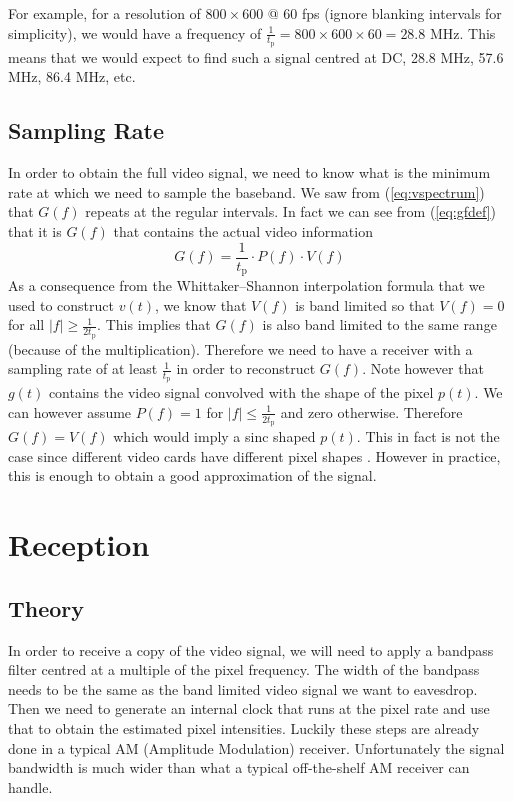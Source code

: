 \documentclass[a4paper,12pt,twoside,openright]{report}
\begin{document}
For example, for a resolution of $800 \times 600 $ @ $ 60$ fps (ignore blanking intervals for simplicity), we would have a frequency of $\frac{1}{t_\text{p}} = 800 \times 600 \times 60 = 28.8$ MHz. This means that we would expect to find such a signal centred at DC, 28.8 MHz, 57.6 MHz, 86.4 MHz, etc.

\subsection{Sampling Rate}

In order to obtain the full video signal, we need to know what is the minimum rate at which we need to sample the baseband. We saw from (\ref{eq:vspectrum}) that $G(f)$ repeats at the regular intervals. In fact we can see from (\ref{eq:gfdef}) that it is $G(f)$ that contains the actual video information
$$G(f) = \frac{1}{t_\text{p}} \cdot P(f) \cdot V(f)$$
As a consequence from the Whittaker--Shannon interpolation formula that we used to construct $v(t)$, we know that $V(f)$ is band limited so that $V(f) = 0$ for all $|f| \geq \frac{1}{2 t_\text{p}}$. This implies that $G(f)$ is also band limited to the same range (because of the multiplication). Therefore we need to have a receiver with a sampling rate of at least $\frac{1}{t_\text{p}}$ in order to reconstruct $G(f)$. Note however that $g(t)$ contains the video signal convolved with the shape of the pixel $p(t)$. We can however assume $P(f)=1$ for $|f| \le \frac{1}{2 t_\text{p}}$ and zero otherwise. Therefore $G(f) = V(f)$ which would imply a sinc shaped $p(t)$. This in fact is not the case since different video cards have different pixel shapes \cite{kuhn2003compromising}. However in practice, this is enough to obtain a good approximation of the signal.

\section{Reception}

\subsection{Theory}
In order to receive a copy of the video signal, we will need to apply a bandpass filter centred at a multiple of the pixel frequency. The width of the bandpass needs to be the same as the band limited video signal we want to eavesdrop. Then we need to generate an internal clock that runs at the pixel rate and use that to obtain the estimated pixel intensities. Luckily these steps are already done in a typical AM (Amplitude Modulation) receiver. Unfortunately the signal bandwidth is much wider than what a typical off-the-shelf AM receiver can handle.
\end{document}
